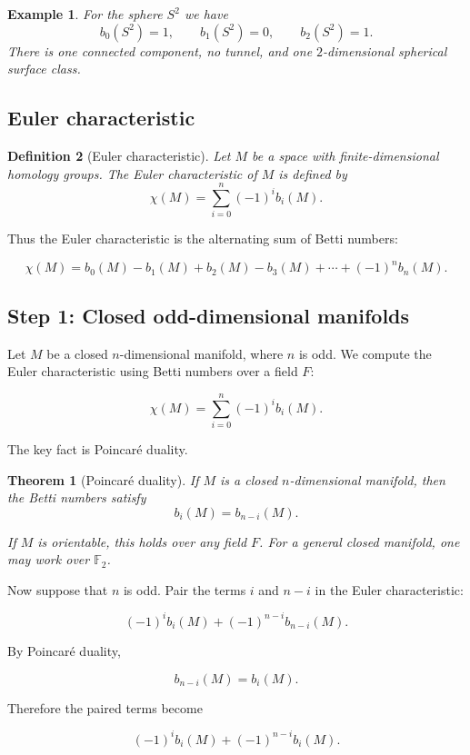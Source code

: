 \documentclass[12pt,a4paper]{article}
\theoremstyle{notespace}
\newtheorem{definition}{Definition}[section]
\newtheorem{example}[definition]{Example}
\newtheorem{theorem}[prop]{Theorem}
\begin{document}
\begin{example}
	For the sphere $S^2$ we have
	\[
	b_0(S^2)=1, \qquad b_1(S^2)=0, \qquad b_2(S^2)=1.
	\]
	There is one connected component, no tunnel, and one $2$-dimensional spherical
	surface class.
\end{example}

\subsection{Euler characteristic}

\begin{definition}[Euler characteristic]
	Let $M$ be a space with finite-dimensional homology groups. The Euler
	characteristic of $M$ is defined by
	\[
	\chi(M)=\sum_{i=0}^{n}(-1)^i b_i(M).
	\]
\end{definition}

Thus the Euler characteristic is the alternating sum of Betti numbers:

\[
\chi(M)
=
b_0(M)-b_1(M)+b_2(M)-b_3(M)+\cdots+(-1)^n b_n(M).
\]

\subsection{Step 1: Closed odd-dimensional manifolds}

Let $M$ be a closed $n$-dimensional manifold, where $n$ is odd. We compute the
Euler characteristic using Betti numbers over a field $F$:

\[
\chi(M)=\sum_{i=0}^{n}(-1)^i b_i(M).
\]

The key fact is Poincaré duality.

\begin{theorem}[Poincaré duality]
	If $M$ is a closed $n$-dimensional manifold, then the Betti numbers satisfy
	\[
	b_i(M)=b_{n-i}(M).
	\]

	If $M$ is orientable, this holds over any field $F$. For a general closed
	manifold, one may work over $\mathbb{F}_2$.
\end{theorem}

Now suppose that $n$ is odd. Pair the terms $i$ and $n-i$ in the Euler
characteristic:

\[
(-1)^i b_i(M) + (-1)^{n-i} b_{n-i}(M).
\]

By Poincaré duality,

\[
b_{n-i}(M)=b_i(M).
\]

Therefore the paired terms become

\[
(-1)^i b_i(M) + (-1)^{n-i} b_i(M).
\]
\end{document}
